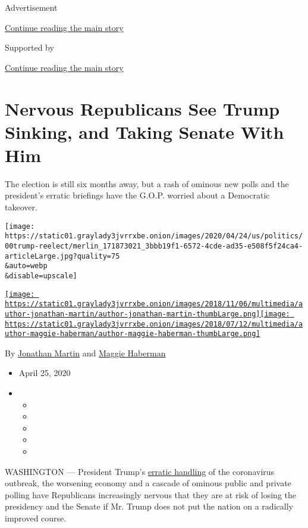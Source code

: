 Advertisement

\protect\hyperlink{after-top}{Continue reading the main story}

Supported by

\protect\hyperlink{after-sponsor}{Continue reading the main story}

\hypertarget{nervous-republicans-see-trump-sinking-and-taking-senate-with-him}{%
\section{Nervous Republicans See Trump Sinking, and Taking Senate With
Him}\label{nervous-republicans-see-trump-sinking-and-taking-senate-with-him}}

The election is still six months away, but a rash of ominous new polls
and the president's erratic briefings have the G.O.P. worried about a
Democratic takeover.

\texttt{[image: https://static01.graylady3jvrrxbe.onion/images/2020/04/24/us/politics/00trump-reelect/merlin\_171873021\_3bbb19f1-6572-4cde-ad35-e508f5f24ca4-articleLarge.jpg?quality=75\\\&auto=webp\\\&disable=upscale]}

\href{https://www.nytimes3xbfgragh.onion/by/jonathan-martin}{\texttt{[image: https://static01.graylady3jvrrxbe.onion/images/2018/11/06/multimedia/author-jonathan-martin/author-jonathan-martin-thumbLarge.png]}}\href{https://www.nytimes3xbfgragh.onion/by/maggie-haberman}{\texttt{[image: https://static01.graylady3jvrrxbe.onion/images/2018/07/12/multimedia/author-maggie-haberman/author-maggie-haberman-thumbLarge.png]}}

By \href{https://www.nytimes3xbfgragh.onion/by/jonathan-martin}{Jonathan
Martin} and
\href{https://www.nytimes3xbfgragh.onion/by/maggie-haberman}{Maggie
Haberman}

\begin{itemize}
\item
  April 25, 2020
\item
  \begin{itemize}
  \item
  \item
  \item
  \item
  \item
  \end{itemize}
\end{itemize}

WASHINGTON --- President Trump's
\href{https://www.nytimes3xbfgragh.onion/2020/04/11/us/politics/coronavirus-trump-response.html}{erratic
handling} of the coronavirus outbreak, the worsening economy and a
cascade of ominous public and private polling have Republicans
increasingly nervous that they are at risk of losing the presidency and
the Senate if Mr. Trump does not put the nation on a radically improved
course.

